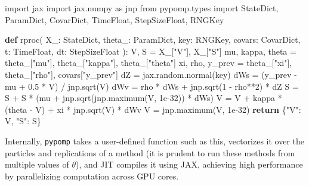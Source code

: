 \documentclass[twoside,11pt]{article}
\newenvironment{Shaded}{\begin{snugshade}}{\end{snugshade}}
\newcommand{\ControlFlowTok}[1]{\textcolor[rgb]{0.00,0.23,0.31}{\textbf{#1}}}
\newcommand{\DecValTok}[1]{\textcolor[rgb]{0.68,0.00,0.00}{#1}}
\newcommand{\FloatTok}[1]{\textcolor[rgb]{0.68,0.00,0.00}{#1}}
\newcommand{\ImportTok}[1]{\textcolor[rgb]{0.00,0.46,0.62}{#1}}
\newcommand{\KeywordTok}[1]{\textcolor[rgb]{0.00,0.23,0.31}{\textbf{#1}}}
\newcommand{\NormalTok}[1]{\textcolor[rgb]{0.00,0.23,0.31}{#1}}
\newcommand{\OperatorTok}[1]{\textcolor[rgb]{0.37,0.37,0.37}{#1}}
\newcommand{\StringTok}[1]{\textcolor[rgb]{0.13,0.47,0.30}{#1}}
\begin{document}
\label{spx-rproc}
\begin{Shaded}
\begin{Highlighting}[]
\ImportTok{import}\NormalTok{ jax}
\ImportTok{import}\NormalTok{ jax.numpy }\ImportTok{as}\NormalTok{ jnp}
\ImportTok{from}\NormalTok{ pypomp.types }\ImportTok{import}\NormalTok{ StateDict, ParamDict, CovarDict, TimeFloat, StepSizeFloat, RNGKey}

\KeywordTok{def}\NormalTok{ rproc(}
\NormalTok{    X\_: StateDict, theta\_: ParamDict, key: RNGKey, covars: CovarDict,}
\NormalTok{    t: TimeFloat, dt: StepSizeFloat}
\NormalTok{):}
\NormalTok{    V, S }\OperatorTok{=}\NormalTok{ X\_[}\StringTok{"V"}\NormalTok{], X\_[}\StringTok{"S"}\NormalTok{]}
\NormalTok{    mu, kappa, theta }\OperatorTok{=}\NormalTok{ theta\_[}\StringTok{"mu"}\NormalTok{], theta\_[}\StringTok{"kappa"}\NormalTok{], theta\_[}\StringTok{"theta"}\NormalTok{]}
\NormalTok{    xi, rho, y\_prev }\OperatorTok{=}\NormalTok{ theta\_[}\StringTok{"xi"}\NormalTok{], theta\_[}\StringTok{"rho"}\NormalTok{], covars[}\StringTok{"y\_prev"}\NormalTok{]}
\NormalTok{    dZ }\OperatorTok{=}\NormalTok{ jax.random.normal(key)}
\NormalTok{    dWs }\OperatorTok{=}\NormalTok{ (y\_prev }\OperatorTok{{-}}\NormalTok{ mu }\OperatorTok{+} \FloatTok{0.5} \OperatorTok{*}\NormalTok{ V) }\OperatorTok{/}\NormalTok{ jnp.sqrt(V)}
\NormalTok{    dWv }\OperatorTok{=}\NormalTok{ rho }\OperatorTok{*}\NormalTok{ dWs }\OperatorTok{+}\NormalTok{ jnp.sqrt(}\DecValTok{1} \OperatorTok{{-}}\NormalTok{ rho}\OperatorTok{**}\DecValTok{2}\NormalTok{) }\OperatorTok{*}\NormalTok{ dZ}
\NormalTok{    S }\OperatorTok{=}\NormalTok{ S }\OperatorTok{+}\NormalTok{ S }\OperatorTok{*}\NormalTok{ (mu }\OperatorTok{+}\NormalTok{ jnp.sqrt(jnp.maximum(V, }\FloatTok{1e{-}32}\NormalTok{)) }\OperatorTok{*}\NormalTok{ dWs)}
\NormalTok{    V }\OperatorTok{=}\NormalTok{ V }\OperatorTok{+}\NormalTok{ kappa }\OperatorTok{*}\NormalTok{ (theta }\OperatorTok{{-}}\NormalTok{ V) }\OperatorTok{+}\NormalTok{ xi }\OperatorTok{*}\NormalTok{ jnp.sqrt(V) }\OperatorTok{*}\NormalTok{ dWv}
\NormalTok{    V }\OperatorTok{=}\NormalTok{ jnp.maximum(V, }\FloatTok{1e{-}32}\NormalTok{)}
    \ControlFlowTok{return}\NormalTok{ \{}\StringTok{"V"}\NormalTok{: V, }\StringTok{"S"}\NormalTok{: S\}}
\end{Highlighting}
\end{Shaded}

Internally, \texttt{pypomp} takes a user-defined function such as this,
vectorizes it over the particles and replications of a method (it is
prudent to run these methods from multiple values of \(\theta\)), and
JIT compiles it using JAX, achieving high performance by parallelizing
computation across GPU cores.
\end{document}
